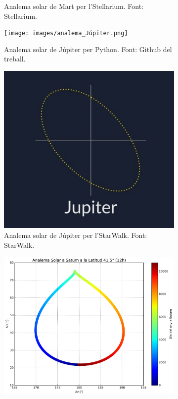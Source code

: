 \documentclass[a4paper, 11pt]{article}
\begin{document}
\begin{figure}[h!]
\begin{subfigure}{0.45\textwidth}
        \caption{Analema solar de Mart per l'Stellarium. Font: Stellarium.}
    \end{subfigure}
    \begin{subfigure}{0.45\textwidth}
        \centering
        \texttt{[image: images/analema\_Júpiter.png]}
        \caption{Analema solar de Júpiter per Python. Font: Github del treball.}
    \end{subfigure}
    \hspace{0.05\textwidth}
    \begin{subfigure}{0.42\textwidth}
        \centering
        \includegraphics[width=\textwidth]{images/stellarium_jupiter_general.png}
        \caption{Analema solar de Júpiter per l'StarWalk. Font: StarWalk.}
    \end{subfigure}
    \begin{subfigure}{0.45\textwidth}
        \centering
        \includegraphics[width=\textwidth]{images/analema_Saturn.png}

\end{subfigure}
\end{figure}
\end{document}
